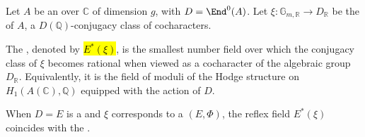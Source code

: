 \begin{definition} \label{definition:reflex_field_of_the_rational_hodge_type_of_a_complex_abelian_variety}
    Let $A$ be an  over $\mathbb{C}$ of dimension $g$, with  $D = \End^0(A)$. Let $\xi: \mathbb{G}_{m,\mathbb{R}} \to D_\mathbb{R}$ be the  of $A$, a $D(\mathbb{Q})$-conjugacy class of cocharacters.

    The , denoted by \hl{$E^*(\xi)$}, is the smallest number field over which the conjugacy class of $\xi$ becomes rational when viewed as a cocharacter of the algebraic group $D_\mathbb{R}$. Equivalently, it is the field of moduli of the Hodge structure on $H_1(A(\mathbb{C}), \mathbb{Q})$ equipped with the action of $D$.

    When $D = E$ is a  and $\xi$ corresponds to a  $(E, \Phi)$, the reflex field $E^*(\xi)$ coincides with the .
\end{definition}
